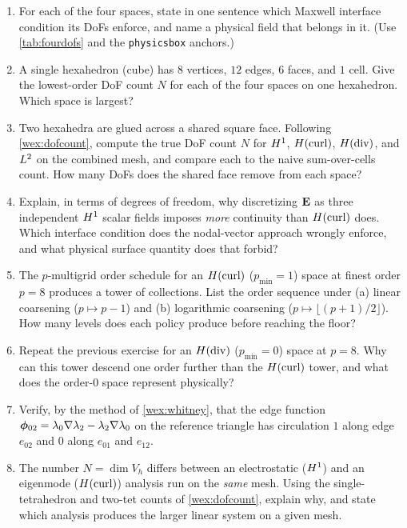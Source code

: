 \exercisessection
\begin{enumerate}[nosep]
\item For each of the four spaces, state in one sentence which Maxwell interface condition its DoFs
  enforce, and name a physical field that belongs in it. (Use \cref{tab:fourdofs} and the
  \texttt{physicsbox} anchors.)
\item A single hexahedron (cube) has $8$ vertices, $12$ edges, $6$ faces, and $1$ cell. Give the
  lowest-order DoF count $N$ for each of the four spaces on one hexahedron. Which space is largest?
\item Two hexahedra are glued across a shared square face. Following
  \cref{wex:dofcount}, compute the true DoF count $N$ for $H^1$, $H(\mathrm{curl})$, $H(\mathrm{div})$, and $L^2$ on the
  combined mesh, and compare each to the naive sum-over-cells count. How many DoFs does the shared face
  remove from each space?
\item Explain, in terms of degrees of freedom, why discretizing $\mathbf{E}$ as three independent $H^1$
  scalar fields imposes \emph{more} continuity than $H(\mathrm{curl})$ does. Which interface condition does the
  nodal-vector approach wrongly enforce, and what physical surface quantity does that forbid?
\item The $p$-multigrid order schedule for an $H(\mathrm{curl})$ ($p_{\min}=1$) space at finest order $p=8$
  produces a tower of collections. List the order sequence under (a) linear coarsening
  ($p\mapsto p-1$) and (b) logarithmic coarsening ($p\mapsto\lfloor(p+1)/2\rfloor$). How many levels
  does each policy produce before reaching the floor?
\item Repeat the previous exercise for an $H(\mathrm{div})$ ($p_{\min}=0$) space at $p=8$. Why can this tower
  descend one order further than the $H(\mathrm{curl})$ tower, and what does the order-$0$ space represent
  physically?
\item Verify, by the method of \cref{wex:whitney}, that the edge function
  $\boldsymbol{\phi}_{02}=\lambda_0\nabla\lambda_2-\lambda_2\nabla\lambda_0$ on the reference triangle has
  circulation $1$ along edge $e_{02}$ and $0$ along $e_{01}$ and $e_{12}$.
\item The number $N=\dim V_h$ differs between an electrostatic ($H^1$) and an eigenmode ($H(\mathrm{curl})$)
  analysis run on the \emph{same} mesh. Using the single-tetrahedron and two-tet counts of
  \cref{wex:dofcount}, explain why, and state which analysis produces the larger linear system on a given
  mesh.
\end{enumerate}
